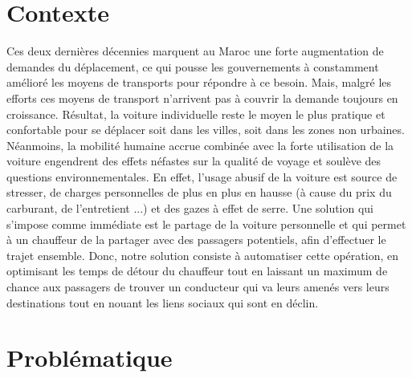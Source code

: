 
\section{Contexte}

Ces deux dernières décennies marquent au Maroc une forte augmentation de demandes du déplacement, ce qui pousse les gouvernements à constamment amélioré les moyens de transports pour répondre à ce besoin.\newline
Mais, malgré les efforts ces moyens de transport n'arrivent pas à couvrir la demande toujours en croissance.\newline
Résultat, la voiture individuelle reste le moyen le plus pratique et confortable pour se déplacer soit dans les villes, soit dans les zones non urbaines. Néanmoins, la mobilité humaine accrue combinée avec la forte utilisation de la voiture engendrent des effets néfastes sur la qualité de voyage et soulève des questions environnementales.\newline
En effet, l'usage abusif de la voiture est source de stresser, de charges personnelles de plus en plus en hausse (à cause du prix du carburant, de l'entretient ...) et des gazes à effet de serre.\newline
Une solution qui s'impose comme immédiate est le partage de la voiture personnelle et qui permet à un chauffeur de la partager avec des passagers potentiels, afin d'effectuer le trajet ensemble.\newline
Donc, notre solution consiste à automatiser cette opération, en optimisant les temps de détour du chauffeur tout en laissant un maximum de chance aux passagers de trouver un conducteur qui va leurs amenés vers leurs destinations tout en nouant les liens sociaux qui sont en déclin.

\section{Problématique}

